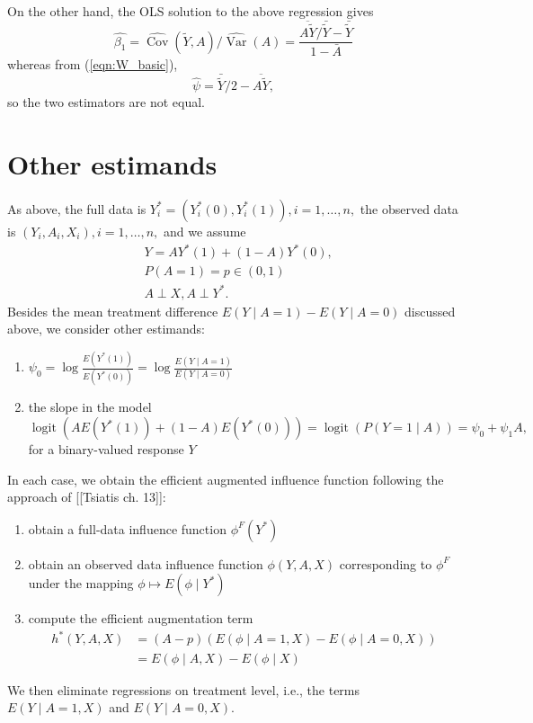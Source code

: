 \message{ !name(manuscript.tex)}\documentclass[10pt,a4paper]{amsart}
\newcommand{\EE}{E}
\newcommand{\PP}{P}
\DeclareMathOperator{\Var}{Var}
\DeclareMathOperator{\Cov}{Cov}
\DeclareMathOperator{\logit}{logit}
\begin{document}
On the other hand, the OLS solution to the above regression gives
\[
  \hat{\beta_1} = \hat{\Cov}(\tilde{Y},A)/\hat{\Var}(A) = \frac{\overline{A\tilde{Y}}/\bar{\tilde{Y}} - \bar{\tilde{Y}}}{1-\bar{A}}
\]
whereas from (\ref{eqn:W_basic}),
\[
  \hat{\psi}=\bar{\tilde{Y}}/2 - \overline{A\tilde{Y}},
\]
so the two estimators are not equal.
\section{Other estimands}
As above, the full data is $Y_i^*=(Y_i^*(0),Y_i^*(1)),i=1,\ldots,n,$ the observed data is $(Y_i,A_i,X_i),i=1,\ldots,n,$ and we assume
\begin{align*}
  &Y = AY^*(1) + (1-A)Y^*(0),\\
  &\PP(A=1)=p\in (0,1)\\
  &A \perp X, A\perp Y^*.
\end{align*}
Besides the mean treatment difference $\EE(Y\mid A=1) -
\EE(Y\mid A=0)$ discussed above, we consider other estimands:
\begin{enumerate}
\item $\psi_0 = \log\frac{E(Y^*(1))}{E(Y^*(0))}=\log\frac{E(Y\mid A=1)}{E(Y\mid
    A=0)}$
\item the slope in the model
  \[
    \logit(A\EE(Y^*(1)) + (1-A)\EE(Y^*(0))) = \logit(P(Y=1\mid A))
    = \psi_0 + \psi_1A,
  \]
  for a binary-valued response $Y$
\end{enumerate}

In each case, we obtain the efficient augmented influence function
following the approach of [[Tsiatis ch. 13]]:
\begin{enumerate}
\item obtain a full-data influence function $\phi^F(Y^*)$
  \item obtain an observed data influence function $\phi(Y,A,X)$ corresponding to
    $\phi^F$ under the mapping $\phi \mapsto \EE(\phi\mid Y^*)$
  \item compute the efficient augmentation term
    \begin{align*}
      h^*(Y,A,X)&=(A-p)(\EE(\phi\mid A=1,X) - \EE(\phi\mid A=0,X))\\
                &=\EE(\phi\mid A,X) - \EE(\phi\mid X)
    \end{align*}

\end{enumerate}
We then eliminate regressions on treatment level, i.e., the terms $\EE(Y\mid A=1,X)$ and
$\EE(Y\mid A=0,X).$
\end{document}
